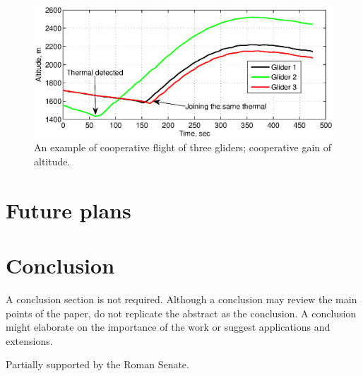 \documentclass{ifacconf}
\begin{document}
\begin{figure}[thpb]
  \centering
  \includegraphics[scale=0.45]{Figures/Coop_gain_altitude.eps}
  \caption{An example of cooperative flight of three gliders; cooperative gain of altitude.}
  \label{fig:CoopFlightHeight}
\end{figure}

\section{Future plans}
\label{sec:Future}


\section{Conclusion}

A conclusion section is not required. Although a conclusion may review the main points of the paper, do not replicate the abstract as the conclusion. A conclusion might elaborate on the importance of the work or suggest applications and extensions.

\begin{ack}                               %
Partially supported by the Roman Senate.  %
\end{ack}



\end{document}
